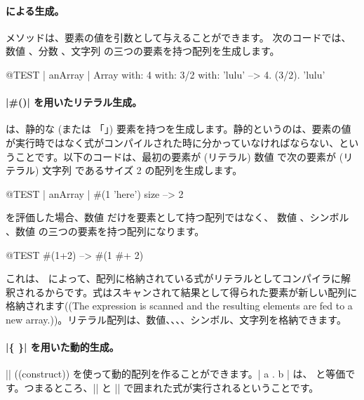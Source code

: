 \documentclass[a4paper,10pt,twoside]{book}
\begin{document}
\paragraph{ による生成。}  メソッドは、要素の値を引数として与えることができます。
次のコードでは、数値 、分数 、文字列  の三つの要素を持つ配列を生成します。

\begin{code}{@TEST | anArray |}
Array with: 4 with: 3/2 with: 'lulu' -->  {4. (3/2). 'lulu'}
\end{code}

\paragraph{\ct|\#()| を用いたリテラル生成。}
\ct{#()} は、静的な (または 「」) 要素を持つを生成します。静的というのは、要素の値が実行時ではなく式がコンパイルされた時に分かっていなければならない、ということです。以下のコードは、最初の要素が (リテラル) 数値  で次の要素が (リテラル) 文字列  であるサイズ 2 の配列を生成します。


\begin{code}{@TEST | anArray |}
#(1 'here') size --> 2
\end{code}

 を評価した場合、数値  だけを要素として持つ配列ではなく、 \ie 数値 、シンボル \ct{#+}、数値  の三つの要素を持つ配列になります。

\begin{code}{@TEST}
#(1+2) -->  #(1 #+ 2)
\end{code}

\noindent
これは、\ct{#()} によって、配列に格納されている式がリテラルとしてコンパイラに解釈されるからです。式はスキャンされて結果として得られた要素が新しい配列に格納されます((The expression is scanned and the resulting elements are fed to a new array.))。リテラル配列は、数値、、、、シンボル、文字列を格納できます。

\paragraph{\ct|\{ \}| を用いた動的生成。}
\ct|{}| ((construct)) を使って動的配列を作ることができます。\ct|{ a . b }| は、 と等価です。つまるところ、\ct|{| と \ct|}| で囲まれた式が実行されるということです。
\end{document}
